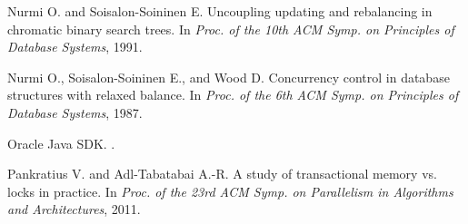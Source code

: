 \begin{thebibliography}{99}
{%
% 


Nurmi O. and Soisalon-Soininen E.
\newblock Uncoupling updating and rebalancing in chromatic binary search trees.
\newblock In {\em Proc. of the 10th ACM Symp. on Principles of Database
  Systems}, 1991.




Nurmi O., Soisalon-Soininen E., and Wood D.
\newblock Concurrency control in database structures with relaxed balance.
\newblock In {\em Proc. of the 6th ACM Symp. on Principles of Database
  Systems}, 1987.

% 


Oracle Java SDK.
.



Pankratius V. and Adl-Tabatabai A.-R.
\newblock A study of transactional memory vs. locks in practice.
\newblock In {\em Proc. of the 23rd ACM Symp. on Parallelism in Algorithms and
  Architectures}, 2011.



}
\end{thebibliography}

